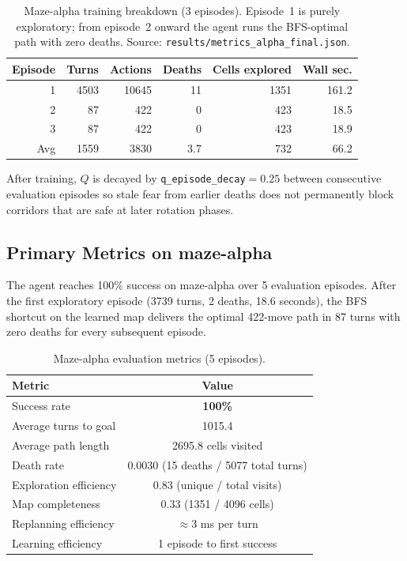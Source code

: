 \documentclass[11pt]{article}
\begin{document}
\begin{table}[H]
\centering
\caption{Maze-alpha training breakdown (3 episodes).  Episode~1 is
purely exploratory; from episode~2 onward the agent runs the
BFS-optimal path with zero deaths.  Source:
\texttt{results/metrics\_alpha\_final.json}.}
\label{tab:alpha-train}
\begin{tabular}{rrrrrr}
\toprule
Episode & Turns & Actions & Deaths & Cells explored & Wall sec. \\
\midrule
1   & 4503 & 10645 & 11 & 1351 & 161.2 \\
2   &   87 &   422 &  0 &  423 &  18.5 \\
3   &   87 &   422 &  0 &  423 &  18.9 \\
\midrule
Avg & 1559 &  3830 & 3.7 &  732 &  66.2 \\
\bottomrule
\end{tabular}
\end{table}

After training, $Q$ is decayed by \texttt{q\_episode\_decay}$=0.25$
between consecutive evaluation episodes so stale fear from earlier
deaths does not permanently block corridors that are safe at later
rotation phases.

\subsection{Primary Metrics on maze-alpha}
The agent reaches 100\% success on maze-alpha over 5 evaluation episodes.
After the first exploratory episode (3739 turns, 2 deaths, 18.6 seconds),
the BFS shortcut on the learned map delivers the optimal 422-move path
in 87 turns with zero deaths for every subsequent episode.

\begin{table}[H]
\centering
\caption{Maze-alpha evaluation metrics (5 episodes).}
\label{tab:alpha}
\begin{tabular}{lc}
\toprule
Metric & Value \\
\midrule
Success rate           & \textbf{100\%} \\
Average turns to goal  & 1015.4 \\
Average path length    & 2695.8 cells visited \\
Death rate             & 0.0030 (15 deaths / 5077 total turns) \\
Exploration efficiency & 0.83 (unique / total visits) \\
Map completeness       & 0.33 (1351 / 4096 cells) \\
Replanning efficiency  & $\approx$3 ms per turn \\
Learning efficiency    & 1 episode to first success \\
\bottomrule
\end{tabular}
\end{table}
\end{document}
